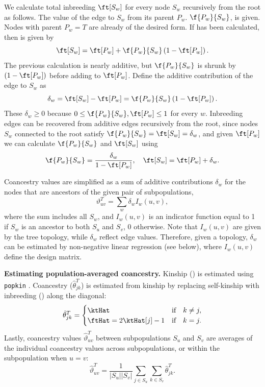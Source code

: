 \documentclass[11pt]{article}
\begin{document}
We calculate total inbreeding $\ft[S_w]$ for every node $S_w$ recursively from the root as follows.
The value of the edge to $S_w$ from its parent $P_w$. $\f{P_w}{S_w}$, is given.
Nodes with parent $P_w = T$ are already of the desired form.
If \ft[P_w] has been calculated, then \ft[S_w] is given by \citep{ochoa_fst1}
$$
\ft[S_w] = \ft[P_w] + \f{P_w}{S_w} \left( 1 - \ft[P_w] \right).
$$
The previous calculation is nearly additive, but $\f{P_w}{S_w}$ is shrunk by $\left( 1 - \ft[P_w] \right)$ before adding to $\ft[P_w]$.
Define the additive contribution of the edge to $S_w$ as
$$
\delta_w = \ft[S_w] - \ft[P_w] = \f{P_w}{S_w} \left( 1 - \ft[P_w] \right).
$$
These $\delta_w \ge 0$ because $0 \le \f{P_w}{S_w}, \ft[P_w] \le 1$ for every $w$.
Inbreeding edges can be recovered from additive edges recursively from the root, since nodes $S_w$ connected to the root satisfy
$\f{P_w}{S_w} = \ft[S_w] = \delta_w$,
and given $\ft[P_w]$ we can calculate $\f{P_w}{S_w}$ and $\ft[S_w]$ using
\begin{equation*}
  \f{P_w}{S_w}
  =
  \frac{ \delta_w }{ 1 - \ft[P_w] },
  \quad
  \ft[S_w]
  =
  \ft[P_w] + \delta_w
  .
\end{equation*}

Coancestry values are simplified as a sum of additive contributions $\delta_w$ for the nodes that are ancestors of the given pair of subpopulations,
\begin{equation}
  \label{eq:coanc_tree_additive}
  \vartheta_{uv}^T
  =
  \sum_w \delta_w I_w(u,v)
  ,
\end{equation}
where the sum includes all $S_w$, and $I_w(u,v)$ is an indicator function equal to 1 if $S_w$ is an ancestor to both $S_u$ and $S_v$, 0 otherwise.
Note that $I_w(u,v)$ are given by the tree topology, while $\delta_w$ reflect edge values.
Therefore, given a topology, $\delta_w$ can be estimated by non-negative linear regression (see below), where $I_w(u,v)$ define the design matrix.

\textbf{Estimating population-averaged coancestry.}
Kinship (\ktHat) is estimated using \texttt{popkin} \citep{ochoa_estimating_2021}.
Coancestry ($\hat{\theta}_{jk}^T$) is estimated from kinship by replacing self-kinship with inbreeding (\ftHat) along the diagonal:
\begin{equation}
  \label{eq:kinship_to_coanc}
  \hat{\theta}_{jk}^T
  =
  \begin{cases}
    \ktHat & \text{if} \quad k \ne j, \\
    \ftHat = 2 \ktHat[j] - 1 & \text{if} \quad k = j.
  \end{cases}
\end{equation}
Lastly, coancestry values $\hat{\vartheta}_{uv}^T$ between subpopulations $S_u$ and $S_v$ are averages of the individual coancestry values across subpopulations, or within the subpopulation when $u=v$:
$$
\hat{\vartheta}_{uv}^T
=
\frac{1}{|S_u||S_v|} \sum_{j \in S_u} \sum_{k \in S_v} \hat{\theta}_{jk}^T
.
$$
\end{document}
